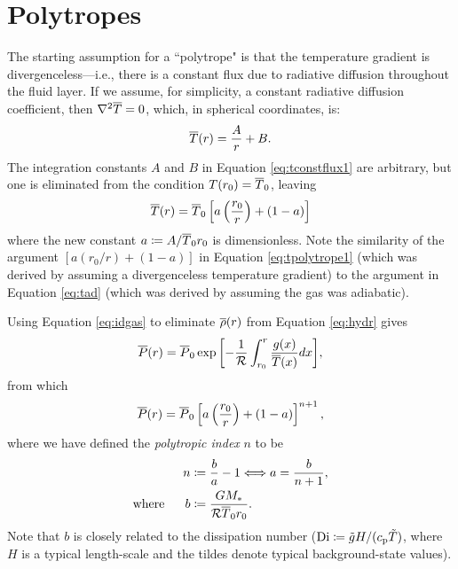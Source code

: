 \documentclass[12pt]{article} %
\begin{document}
\section{Polytropes}
The starting assumption for a ``polytrope" is that the temperature gradient is divergenceless---i.e., there is a constant flux due to radiative diffusion throughout the fluid layer. If we assume, for simplicity, a constant radiative diffusion coefficient, then $\nabla^2\overline{T}=0$, which, in spherical coordinates, is: 
\begin{align}
\overline{T}(r) = \frac{A}{r} + B.
\label{eq:tconstflux1}
\end{align}
The integration constants $A$ and $B$ in Equation \eqref{eq:tconstflux1} are arbitrary, but one is eliminated from the condition $T(r_0) = \overline{T}_0$, leaving
\begin{align}
\overline{T}(r) = \overline{T}_0 \left[a\left(\frac{r_0}{r}\right) + (1 - a)\right]
\label{eq:tpolytrope1}
\end{align}
where the new constant $a\coloneqq A/\overline{T}_0r_0$ is dimensionless. Note the similarity of the argument $[a(r_0/r) + (1-a)]$ in Equation \eqref{eq:tpolytrope1} (which was derived by assuming a divergenceless temperature gradient) to the argument in Equation \eqref{eq:tad} (which was derived by assuming the gas was adiabatic). 

Using Equation \eqref{eq:idgas} to eliminate $\overline{\rho}(r)$ from Equation \eqref{eq:hydr} gives
\begin{align*}
\overline{P}(r) = \overline{P}_0\exp{\left[-\frac{1}{\mathcal{R}}\int_{r_0}^r\frac{g(x)}{\overline{T}(x)}dx\right]},
\end{align*}
from which
\begin{align}
\overline{P}(r) = \overline{P}_0\left[a\left(\frac{r_0}{r}\right) + (1 - a)\right]^{n+1},
\label{eq:ppolytrope1}
\end{align}
where we have defined the \textit{polytropic index} $n$ to be
\begin{align}
n&\coloneqq \frac{b}{a} - 1 \Longleftrightarrow a = \frac{b}{n+1},\\
\text{where}\ \ \ \ \  b&\coloneqq \frac{GM_*}{\mathcal{R} \overline{T}_0 r_0}.
\label{def:polytropicindex}
\end{align}
Note that $b$ is closely related to the dissipation number (${\rm{Di}}\coloneqq \tilde{g}H/(c_{\rm{p}}\tilde{T})$, where $H$ is a typical length-scale and the tildes denote typical background-state values). 
\end{document}
